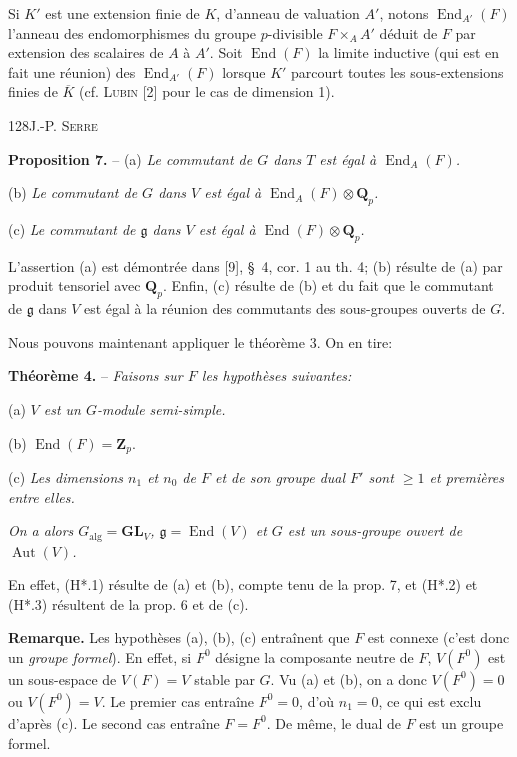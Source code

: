 Si $K'$ est une extension finie de $K$, d'anneau de valuation $A'$, notons $\operatorname{End}_{A'}(F)$ l'anneau des endomorphismes du groupe $p$-divisible $F\times_A A'$ déduit de $F$ par extension des scalaires de $A$ à $A'$. Soit $\operatorname{End}(F)$ la limite inductive (qui est en fait une réunion) des $\operatorname{End}_{A'}(F)$ lorsque $K'$ parcourt toutes les sous-extensions finies de $\overline K$ (cf. \textsc{Lubin} [2] pour le cas de dimension 1).

128\hfill J.-P. \textsc{Serre}

\textbf{Proposition 7.} -- (a) \textit{Le commutant de $G$ dans $T$ est égal à $\operatorname{End}_A(F)$.}

(b) \textit{Le commutant de $G$ dans $V$ est égal à $\operatorname{End}_A(F)\otimes\mathbf Q_p$.}

(c) \textit{Le commutant de $\mathfrak g$ dans $V$ est égal à $\operatorname{End}(F)\otimes\mathbf Q_p$.}

L'assertion (a) est démontrée dans [9], \S\ 4, cor. 1 au th. 4; (b) résulte de (a) par produit tensoriel avec $\mathbf Q_p$. Enfin, (c) résulte de (b) et du fait que le commutant de $\mathfrak g$ dans $V$ est égal à la réunion des commutants des sous-groupes ouverts de $G$.

Nous pouvons maintenant appliquer le théorème 3. On en tire:

\textbf{Théorème 4.} -- \textit{Faisons sur $F$ les hypothèses suivantes:}

(a) \textit{$V$ est un $G$-module semi-simple.}

(b) $\operatorname{End}(F)=\mathbf Z_p$.

(c) \textit{Les dimensions $n_1$ et $n_0$ de $F$ et de son groupe dual $F'$ sont $\geq1$ et premières entre elles.}

\textit{On a alors $G_{\mathrm{alg}}=\mathbf{GL}_V$, $\mathfrak g=\operatorname{End}(V)$ et $G$ est un sous-groupe ouvert de $\operatorname{Aut}(V)$.}

En effet, (H*.1) résulte de (a) et (b), compte tenu de la prop. 7, et (H*.2) et (H*.3) résultent de la prop. 6 et de (c).

\textbf{Remarque.} Les hypothèses (a), (b), (c) entraînent que $F$ est connexe (c'est donc un \textit{groupe formel}). En effet, si $F^0$ désigne la composante neutre de $F$, $V(F^0)$ est un sous-espace de $V(F)=V$ stable par $G$. Vu (a) et (b), on a donc $V(F^0)=0$ ou $V(F^0)=V$. Le premier cas entraîne $F^0=0$, d'où $n_1=0$, ce qui est exclu d'après (c). Le second cas entraîne $F=F^0$. De même, le dual de $F$ est un groupe formel.

